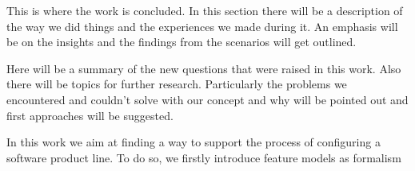 This is where the work is concluded. In this section there will be a description of the way we did things and the experiences we made during it. An emphasis will be on the insights and the findings from the scenarios will get outlined.

Here will be a summary of the new questions that were raised in this work. Also there will be topics for further research. Particularly the problems we encountered and couldn't solve with our concept and why will be pointed out and first approaches will be suggested.

In this work we aim at finding a way to support the process of configuring a software product line. To do so, we firstly introduce feature models as formalism



